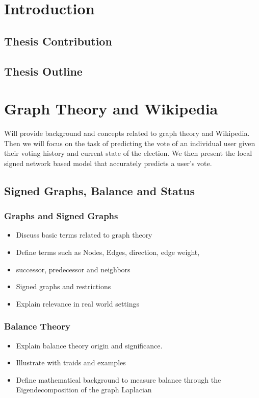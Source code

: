 \chapter{Introduction}

\section{Thesis Contribution}
\section{Thesis Outline}

\chapter{Graph Theory and Wikipedia}
Will provide background and concepts related to graph theory and Wikipedia. Then we will focus on the task of predicting the vote of an individual user given their voting history and current state of the election. We then present the local signed network based model that accurately predicts a user's vote. 

\section{Signed Graphs, Balance and Status}
\subsection{Graphs and Signed Graphs }
\begin{itemize}
    \item Discuss basic terms related to graph theory 
    \item Define terms such as Nodes, Edges, direction, edge weight,
    \item successor, predecessor and neighbors
    \item Signed graphs and restrictions 
    \item Explain relevance in real world settings
\end{itemize}

\subsection{Balance Theory}
\begin{itemize}
    \item Explain balance theory origin and significance.
    \item Illustrate with traids and examples
    \item Define mathematical background to measure balance through the Eigendecomposition of the graph Laplacian  
\end{itemize}

